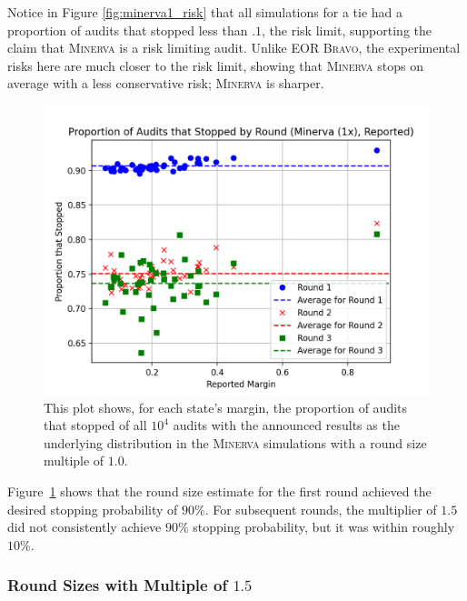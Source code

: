 \documentclass[runningheads]{llncs}
\newcommand{\Minerva}{\textsc{Minerva}\xspace}
\newcommand{\BRAVO}{\textsc{Bravo}\xspace}
\begin{document}
Notice in Figure \ref{fig:minerva1_risk} that all simulations for a tie had a proportion of audits that stopped less than $.1$, the risk limit, supporting
the claim that \Minerva is a risk limiting audit. 
Unlike EOR \BRAVO, the experimental risks here are much closer to the risk limit,
showing that \Minerva stops on average with a less conservative risk; \Minerva is sharper.

\begin{figure}[H]
\includegraphics[width=\textwidth]{minerva_multiround_1x_10^4/sprobs_first_three.png}
\caption{This plot shows, for each state's margin, the proportion of audits that stopped of
all $10^4$ audits with the announced results as the underlying distribution
in the \Minerva simulations with a round size multiple of $1.0$.}
\label{fig:minerva1_sprob}
\end{figure}

Figure~\ref{fig:minerva1_sprob} shows that the round size estimate for the first round achieved the desired
stopping probability of $90\%$. For subsequent rounds, the multiplier of $1.5$ did not consistently achieve $90\%$ stopping
probability, but it was within  roughly $10\%$. 

\subsubsection{Round Sizes with Multiple of $1.5$}

\end{document}
